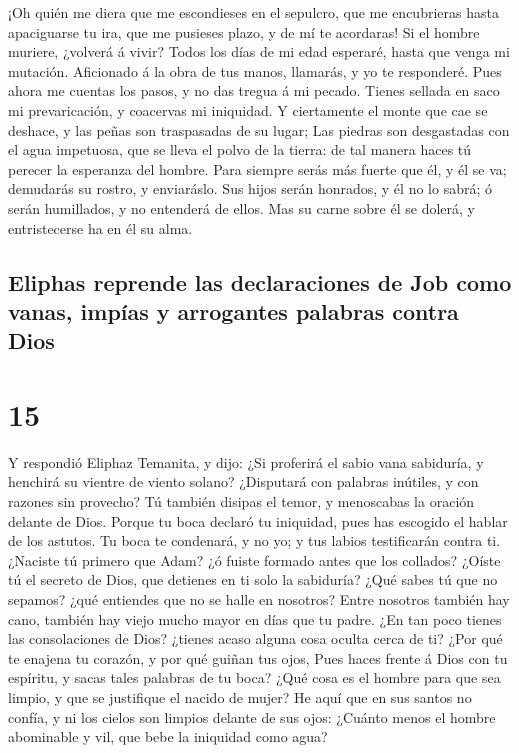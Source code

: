  ¡Oh quién me diera que me escondieses en el sepulcro,
que me encubrieras hasta apaciguarse tu ira, que me pusieses plazo, y de
mí te acordaras!  Si el hombre muriere, ¿volverá á vivir?
Todos los días de mi edad esperaré, hasta que venga mi mutación.
 Aficionado á la obra de tus manos, llamarás, y yo te
responderé.  Pues ahora me cuentas los pasos, y no das
tregua á mi pecado.  Tienes sellada en saco mi
prevaricación, y coacervas mi iniquidad.  Y ciertamente
el monte que cae se deshace, y las peñas son traspasadas de su lugar;
 Las piedras son desgastadas con el agua impetuosa, que
se lleva el polvo de la tierra: de tal manera haces tú perecer la
esperanza del hombre.  Para siempre serás más fuerte que
él, y él se va; demudarás su rostro, y enviaráslo.  Sus
hijos serán honrados, y él no lo sabrá; ó serán humillados, y no
entenderá de ellos.  Mas su carne sobre él se dolerá, y
entristecerse ha en él su alma.

\hypertarget{eliphas-reprende-las-declaraciones-de-job-como-vanas-impuxedas-y-arrogantes-palabras-contra-dios}{%
\subsection{Eliphas reprende las declaraciones de Job como vanas, impías
y arrogantes palabras contra
Dios}\label{eliphas-reprende-las-declaraciones-de-job-como-vanas-impuxedas-y-arrogantes-palabras-contra-dios}}

\hypertarget{section-18-15}{%
\section{15}\label{section-18-15}}

 Y respondió Eliphaz Temanita, y dijo:  ¿Si
proferirá el sabio vana sabiduría, y henchirá su vientre de viento
solano?  ¿Disputará con palabras inútiles, y con razones
sin provecho?  Tú también disipas el temor, y menoscabas
la oración delante de Dios.  Porque tu boca declaró tu
iniquidad, pues has escogido el hablar de los astutos.  Tu
boca te condenará, y no yo; y tus labios testificarán contra ti.
 ¿Naciste tú primero que Adam? ¿ó fuiste formado antes que
los collados?  ¿Oíste tú el secreto de Dios, que detienes
en ti solo la sabiduría?  ¿Qué sabes tú que no sepamos?
¿qué entiendes que no se halle en nosotros?  Entre
nosotros también hay cano, también hay viejo mucho mayor en días que tu
padre.  ¿En tan poco tienes las consolaciones de Dios?
¿tienes acaso alguna cosa oculta cerca de ti?  ¿Por qué
te enajena tu corazón, y por qué guiñan tus ojos,  Pues
haces frente á Dios con tu espíritu, y sacas tales palabras de tu boca?
 ¿Qué cosa es el hombre para que sea limpio, y que se
justifique el nacido de mujer?  He aquí que en sus santos
no confía, y ni los cielos son limpios delante de sus ojos:
 ¿Cuánto menos el hombre abominable y vil, que bebe la
iniquidad como agua?


